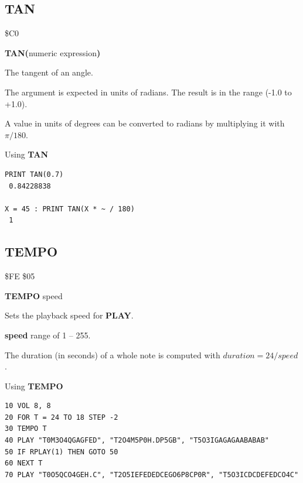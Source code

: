 \subsection{TAN}
\begin{description}[leftmargin=2cm,style=nextline]
\item [Token:]    \$C0

\item [Format:]   {\bf TAN(}numeric expression{\bf)}

\item [Returns:]  The tangent of an angle.

                  The argument is expected in units of radians. The result is in the range (-1.0 to +1.0).

\item [Remarks:]  A value in units of degrees can be converted to radians by multiplying it with $\pi/180$.

\item [Example:]  Using {\bf TAN}

\begin{tcolorbox}[colback=black,coltext=white]
\verbatimfont{\codefont}
\begin{verbatim}
PRINT TAN(0.7)
 0.84228838

X = 45 : PRINT TAN(X * ~ / 180)
 1
\end{verbatim}
\end{tcolorbox}
\end{description}


\newpage
\subsection{TEMPO}
\begin{description}[leftmargin=2cm,style=nextline]
\item [Token:]    \$FE \$05

\item [Format:]   {\bf TEMPO} speed

\item [Usage:]    Sets the playback speed for {\bf PLAY}.

                  {\bf speed} range of 1 -- 255.

                  The duration (in seconds) of a whole note is computed with $duration = 24 / speed$.

\item [Example:]  Using {\bf TEMPO}

\begin{tcolorbox}[colback=black,coltext=white]
\verbatimfont{\codefont}
\begin{verbatim}
10 VOL 8, 8
20 FOR T = 24 TO 18 STEP -2
30 TEMPO T
40 PLAY "T0M3O4QGAGFED", "T2O4M5P0H.DP5GB", "T5O3IGAGAGAABABAB"
50 IF RPLAY(1) THEN GOTO 50
60 NEXT T
70 PLAY "T0O5QCO4GEH.C", "T2O5IEFEDEDCEGO6P8CP0R", "T5O3ICDCDEFEDCO4C"
\end{verbatim}
\end{tcolorbox}
\end{description}

